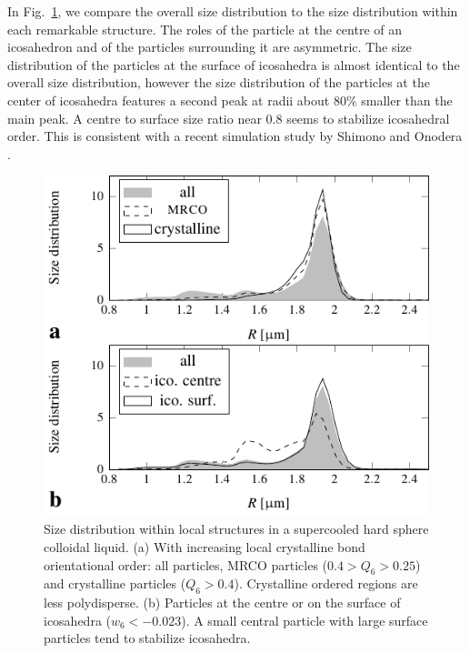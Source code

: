 \documentclass[8.5pt,twoside,twocolumn]{article}
\begin{document}
In Fig.~\ref{fig:size_struc}, we compare the overall size distribution to the size distribution within each remarkable structure. The roles of the particle at the centre of an icosahedron and of the particles surrounding it are asymmetric. The size distribution of the particles at the surface of icosahedra is almost identical to the overall size distribution, however the size distribution of the particles at the center of icosahedra features a second peak at radii about $80\%$ smaller than the main peak. A centre to surface size ratio near $0.8$ seems to stabilize icosahedral order. This is consistent with a recent simulation study by Shimono and Onodera \cite{shimono2012icosahedral}.  

\begin{figure}
	\centering
	\includegraphics{fig_size_struc.pdf}
	\caption{Size distribution within local structures in a supercooled hard sphere colloidal liquid. (a) With increasing local crystalline bond orientational order: all particles, MRCO particles ($0.4>Q_6>0.25$) and crystalline particles ($Q_6>0.4$). Crystalline ordered regions are less polydisperse. (b) Particles at the centre or on the surface of icosahedra ($w_6<-0.023$). A small central particle with large surface particles tend to stabilize icosahedra.}
	\label{fig:size_struc}
\end{figure}
\end{document}

